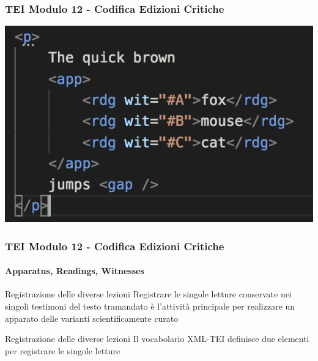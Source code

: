 \begin{frame}
    \frametitle{TEI Modulo 12 - Codifica Edizioni Critiche}
    \addtocounter{nframe}{1}
    


    \begin{center}
        \includegraphics[width=.95\textwidth]{imgs/fox-jumps.png}
    \end{center}

\end{frame}





\begin{frame}
    \frametitle{TEI Modulo 12 - Codifica Edizioni Critiche}
    \framesubtitle{Apparatus, Readings, Witnesses}
    \addtocounter{nframe}{1}




    \begin{block}{Registrazione delle diverse lezioni}
        Registrare le singole letture conservate nei singoli testimoni del testo tramandato è l'attività principale per realizzare un apparato delle varianti scientificamente curato 
    \end{block}

    \begin{block}{Registrazione delle diverse lezioni}
        Il vocabolario XML-TEI definisce due elementi per registrare le singole letture 
    \end{block}


\end{frame}


